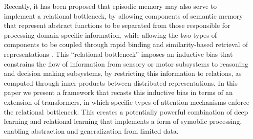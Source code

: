 Recently, it has been proposed that episodic memory may also serve to implement a relational bottleneck,
by allowing components of semantic memory that represent abstract functions to be separated from those
responsible for processing domain-specific information, while allowing the two types of components to be coupled
through rapid binding and similarity-based retrieval of representations \citep{esbn}.
This ``relational bottleneck'' imposes an inductive bias that constrains the flow of information from sensory or
motor subsystems to reasoning and decision making subsystems, by restricting this information to relations, as
computed through inner products between distributed representations.
In this paper we present a framework that recasts this inductive bias in terms of an extension of transformers, in
which specific types of attention mechanisms enforce the relational bottleneck. This creates a potentially powerful
combination of deep learning and relational learning that implements a form of symoblic processing, enabling
abstraction and generalization from limited data.


